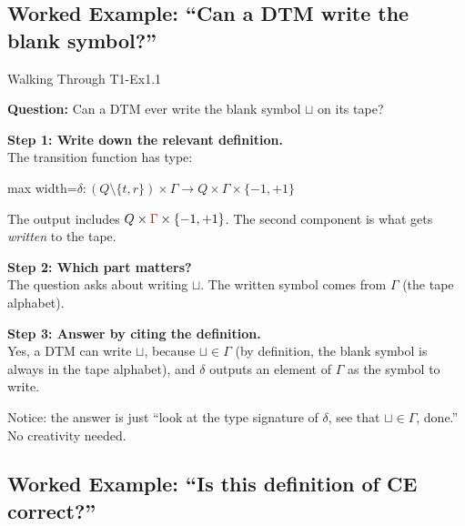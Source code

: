 \documentclass[11pt,a4paper]{article}
\newcommand{\fitmath}[1]{\begin{adjustbox}{max width=\linewidth}$\displaystyle #1$\end{adjustbox}}
\newcommand{\keytakeaway}[1]{%
  \par\vspace{0.3em}%
  \colorbox{yellow!60}{\parbox{\dimexpr\linewidth-2\fboxsep}{#1}}%
  \vspace{0.3em}}
\newcommand{\blank}{\sqcup}
\begin{document}
\subsection{Worked Example: ``Can a DTM write the blank symbol?''}

\begin{examplebox}{Walking Through T1-Ex1.1}

\textbf{Question:} Can a DTM ever write the blank symbol $\blank$ on its tape?

\textbf{Step 1: Write down the relevant definition.}\\
The transition function has type:
\fitmath{\delta : (Q \setminus \{t,r\}) \times \Gamma \to Q \times \Gamma \times \{-1, +1\}}

The output includes $Q \times \textcolor{red}{\Gamma} \times \{-1,+1\}$. The second component is what gets \emph{written} to the tape.

\textbf{Step 2: Which part matters?}\\
The question asks about writing $\blank$. The written symbol comes from $\Gamma$ (the tape alphabet).

\textbf{Step 3: Answer by citing the definition.}\\
Yes, a DTM can write $\blank$, because $\blank \in \Gamma$ (by definition, the blank symbol is always in the tape alphabet), and $\delta$ outputs an element of $\Gamma$ as the symbol to write.

\keytakeaway{Notice: the answer is just ``look at the type signature of $\delta$, see that $\blank \in \Gamma$, done.'' No creativity needed.}
\end{examplebox}

\subsection{Worked Example: ``Is this definition of CE correct?''}
\end{document}

